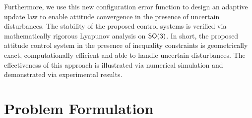 \documentclass[10pt,fleqn]{IJCAS}  %
\begin{document}
\begin{multicols}{2}
Furthermore, we use this new configuration error function to design an adaptive update law to enable attitude convergence in the presence of uncertain disturbances. 
The stability of the proposed control systems is verified via mathematically rigorous Lyapunov analysis on $\mathsf{SO(3)}$.  
In short, the proposed attitude control system in the presence of inequality constraints is geometrically exact, computationally efficient and able to handle uncertain disturbances. 
The effectiveness of this approach is illustrated via numerical simulation and demonstrated via experimental results.%

\section{Problem Formulation}\label{sec:prob_form}

\end{multicols}
\end{document}
